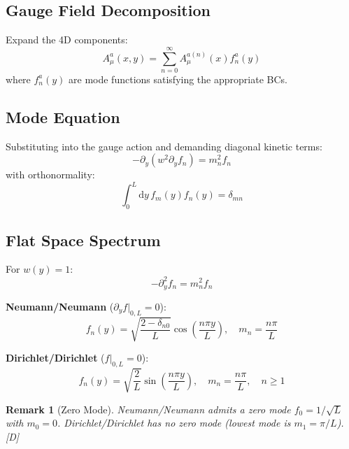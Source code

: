 \documentclass[11pt,a4paper]{article}
\newtheorem{remark}[theorem]{Remark}
\newcommand{\dd}{\mathrm{d}}
\begin{document}
\subsection{Gauge Field Decomposition}

Expand the 4D components:
\begin{equation}
A_\mu^a(x,y) = \sum_{n=0}^{\infty} A_\mu^{a(n)}(x) f_n^a(y)
\label{eq:gauge-kk}
\end{equation}
where $f_n^a(y)$ are mode functions satisfying the appropriate BCs.

\subsection{Mode Equation}

Substituting into the gauge action and demanding diagonal kinetic terms:
\begin{equation}
-\partial_y(w^2 \partial_y f_n) = m_n^2 f_n
\label{eq:mode-eq}
\end{equation}
with orthonormality:
\begin{equation}
\int_0^L \dd y\, f_m(y) f_n(y) = \delta_{mn}
\label{eq:orthonorm}
\end{equation}

\subsection{Flat Space Spectrum}

For $w(y) = 1$:
\begin{equation}
-\partial_y^2 f_n = m_n^2 f_n
\label{eq:flat-mode-eq}
\end{equation}

\textbf{Neumann/Neumann} ($\partial_y f|_{0,L} = 0$):
\begin{equation}
f_n(y) = \sqrt{\frac{2 - \delta_{n0}}{L}} \cos\left(\frac{n\pi y}{L}\right), \quad
m_n = \frac{n\pi}{L}
\label{eq:nn-spectrum}
\end{equation}

\textbf{Dirichlet/Dirichlet} ($f|_{0,L} = 0$):
\begin{equation}
f_n(y) = \sqrt{\frac{2}{L}} \sin\left(\frac{n\pi y}{L}\right), \quad
m_n = \frac{n\pi}{L}, \quad n \geq 1
\label{eq:dd-spectrum}
\end{equation}

\begin{remark}[Zero Mode]
Neumann/Neumann admits a zero mode $f_0 = 1/\sqrt{L}$ with $m_0 = 0$.
Dirichlet/Dirichlet has no zero mode (lowest mode is $m_1 = \pi/L$). [D]
\end{remark}
\end{document}

